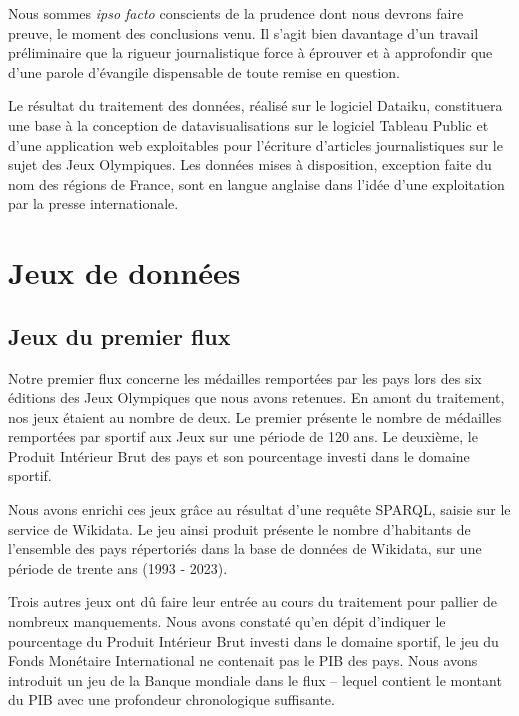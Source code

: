 \documentclass[hidelinks, 12pt]{report}
\begin{document}
Nous sommes \textit{ipso facto} conscients de la prudence dont nous devrons faire preuve, le moment des conclusions venu. Il s'agit bien davantage d'un travail préliminaire que la rigueur journalistique force à éprouver et à approfondir que d'une parole d'évangile dispensable de toute remise en question.

Le résultat du traitement des données, réalisé sur le logiciel Dataiku, constituera une base à la conception de datavisualisations sur le logiciel Tableau Public et d'une application web exploitables pour l'écriture d'articles journalistiques sur le sujet des Jeux Olympiques. Les données mises à disposition, exception faite du nom des régions de France, sont en langue anglaise dans l'idée d'une exploitation par la presse internationale.





%





\chapter{Jeux de données}

\section{Jeux du premier flux}

Notre premier flux concerne les médailles remportées par les pays lors des six éditions des Jeux Olympiques que nous avons retenues. En amont du traitement, nos jeux étaient au nombre de deux. Le premier présente le nombre de médailles remportées par sportif aux Jeux sur une période de 120 ans\autocite{kaggle}. Le deuxième, le Produit Intérieur Brut des pays et son pourcentage investi dans le domaine sportif\autocite{fmi}.

Nous avons enrichi ces jeux grâce au résultat d'une requête SPARQL, saisie sur le service de Wikidata. Le jeu ainsi produit présente le nombre d'habitants de l'ensemble des pays répertoriés dans la base de données de Wikidata, sur une période de trente ans (1993 - 2023)\autocite{wikiquerypop}.

Trois autres jeux ont dû faire leur entrée au cours du traitement pour pallier de nombreux manquements. Nous avons constaté qu'en dépit d'indiquer le pourcentage du Produit Intérieur Brut investi dans le domaine sportif, le jeu du Fonds Monétaire International ne contenait pas le PIB des pays. Nous avons introduit un jeu de la Banque mondiale\autocite{worldbank} dans le flux -- lequel contient le montant du PIB avec une profondeur chronologique suffisante.
\end{document}
